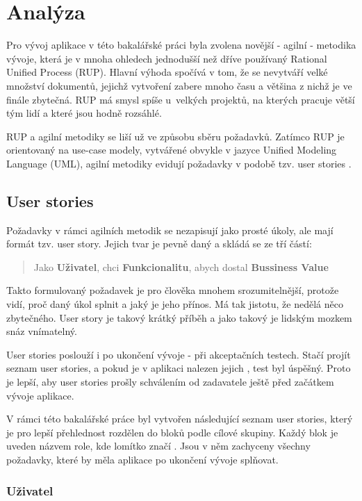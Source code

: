\chapter{Analýza}

Pro vývoj aplikace v této bakalářské práci byla zvolena novější - agilní - metodika vývoje, která je v mnoha ohledech jednodušší než dříve používaný Rational Unified Process (RUP)\cite{rup}. Hlavní výhoda spočívá v tom, že se nevytváří velké množství dokumentů, jejichž vytvoření zabere mnoho času a většina z nichž je ve finále zbytečná. RUP má smysl spíše u~velkých projektů, na kterých pracuje větší tým lidí a které jsou hodně rozsáhlé. 

RUP a agilní metodiky se liší už ve způsobu sběru požadavků. Zatímco RUP je orientovaný na use-case modely, vytvářené obvykle v jazyce Unified Modeling Language (UML)\cite{uml}, agilní metodiky evidují požadavky v podobě tzv. user stories \cite{userstory}.

\section{User stories}

Požadavky v rámci agilních metodik se nezapisují jako prosté úkoly, ale mají formát tzv. user story. Jejich tvar je pevně daný a skládá se ze tří částí:
\begin{quote}
Jako \textbf{Uživatel}, chci \textbf{Funkcionalitu}, abych dostal \textbf{Bussiness Value}
\end{quote}

Takto formulovaný požadavek je pro člověka mnohem srozumitelnější, protože vidí, proč daný úkol splnit a jaký je jeho přínos. Má tak jistotu, že nedělá něco zbytečného. User story je takový krátký příběh a jako takový je lidským mozkem snáz vnímatelný.

User stories poslouží i po ukončení vývoje - při akceptačních testech. Stačí projít seznam user stories, a pokud je v aplikaci nalezen jejich , test byl úspěšný. Proto je lepší, aby user stories prošly schválením od zadavatele ještě před začátkem vývoje aplikace.

V rámci této bakalářské práce byl vytvořen následující seznam user stories, který je pro lepší přehlednost rozdělen do bloků podle cílové skupiny. Každý blok je uveden názvem role, kde lomítko značí . Jsou v něm zachyceny všechny požadavky, které by měla aplikace po ukončení vývoje splňovat.

\subsection{Uživatel}

